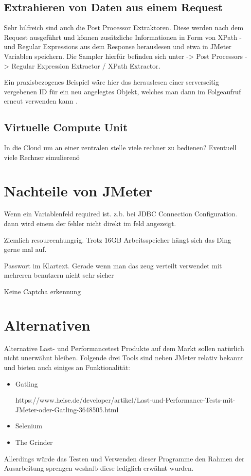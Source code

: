 \documentclass[a4paper,12pt]{article}
\begin{document}
\subsection{Extrahieren von Daten aus einem Request}
Sehr hilfreich sind auch die Post Processor Extraktoren. Diese werden nach dem Request ausgeführt und können zusätzliche Informationen in Form von XPath -und Regular Expressions aus dem Response herauslesen und etwa in JMeter Variablen speichern. Die Sampler hierfür befinden sich unter -> Post Processors -> Regular Expression Extractor / XPath Extractor.

Ein praxisbezogenes Beispiel wäre hier das herauslesen einer serverseitig vergebenen ID für ein neu angelegtes Objekt, welches man dann im Folgeaufruf erneut verwenden kann \cite{online:lasttestjmeter}.   

\subsection{Virtuelle Compute Unit}
In die Cloud um an einer zentralen stelle viele rechner zu bedienen?
Eventuell viele Rechner simulierenö


\section{Nachteile von JMeter}
Wenn ein Variablenfeld required ist. z.b. bei JDBC Connection Configuration. dann wird einem der fehler nicht direkt im feld angezeigt.

Ziemlich resourcenhungrig. Trotz 16GB Arbeitsspeicher hängt sich das Ding gerne mal auf.

Passwort im Klartext. Gerade wenn man das zeug verteilt verwendet mit mehreren benutzern nicht sehr sicher

Keine Captcha erkennung
\section{Alternativen}
Alternative  Last- und Performancetest Produkte auf dem Markt sollen natürlich nicht unerwähnt bleiben. Folgende drei Tools sind neben JMeter relativ bekannt und bieten auch einiges an Funktionalität:
\begin{itemize}
	\item Gatling
	
	https://www.heise.de/developer/artikel/Last-und-Performance-Tests-mit-JMeter-oder-Gatling-3648505.html
	\item Selenium
	\item The Grinder
\end{itemize}
Allerdings würde das Testen und Verwenden dieser Programme den Rahmen der Ausarbeitung sprengen weshalb diese lediglich erwähnt wurden.
\end{document}

